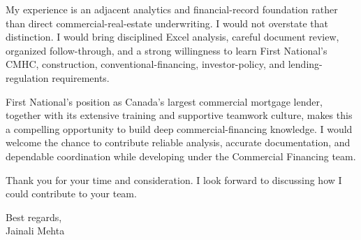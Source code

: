 \documentclass[letterpaper,10pt]{article}
\begin{document}
My experience is an adjacent analytics and financial-record foundation rather than direct commercial-real-estate underwriting. I would not overstate that distinction. I would bring disciplined Excel analysis, careful document review, organized follow-through, and a strong willingness to learn First National's CMHC, construction, conventional-financing, investor-policy, and lending-regulation requirements.

First National's position as Canada's largest commercial mortgage lender, together with its extensive training and supportive teamwork culture, makes this a compelling opportunity to build deep commercial-financing knowledge. I would welcome the chance to contribute reliable analysis, accurate documentation, and dependable coordination while developing under the Commercial Financing team.

Thank you for your time and consideration. I look forward to discussing how I could contribute to your team.

Best regards,\\[8pt]
Jainali Mehta
\end{document}

